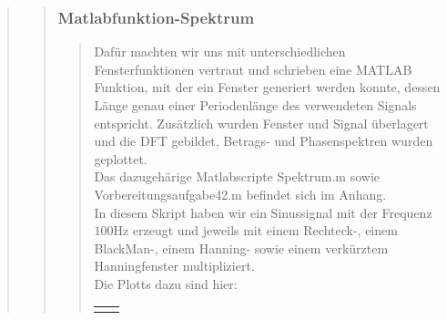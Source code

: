 \begin{quote}
\begin{quote}
        \subsubsection{Matlabfunktion-Spektrum}
		\begin{quote}
            Dafür machten wir uns mit unterschiedlichen Fensterfunktionen vertraut und schrieben eine MATLAB Funktion,
            mit der ein Fenster generiert werden konnte, dessen Länge genau einer Periodenlänge des verwendeten Signals
            entspricht. Zusätzlich wurden Fenster und Signal überlagert und die DFT gebildet, Betrags- und
            Phasenspektren wurden geplottet.\\
            Das dazugehärige Matlabscripte Spektrum.m sowie Vorbereitungsaufgabe42.m befindet sich im Anhang.\\
            In diesem Skript haben wir ein Sinussignal mit der Frequenz $100$Hz erzeugt und jeweils mit einem Rechteck-,
            einem BlackMan-, einem Hanning- sowie einem verkürztem Hanningfenster multipliziert.\\
            Die Plotts dazu sind hier:
            
                \begin{center}
                \begin{tabular}{ll}
    
                \hspace{-11em}
                    \begin{minipage}{0.6\textwidth}
    

\end{minipage}
\end{tabular}
\end{center}
\end{quote}
\end{quote}
\end{quote}
